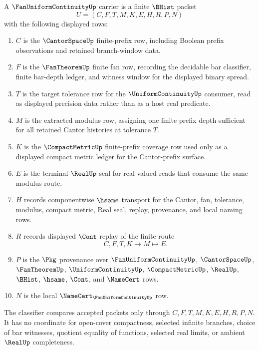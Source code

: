 \begin{definition}
\label{def:fan-uniform-continuity-carrier}
A $\FanUniformContinuityUp$ carrier is a finite $\BHist$ packet
$$
U=(C,F,T,M,K,E,H,R,P,N)
$$
with the following displayed rows:
\begin{enumerate}
\item $C$ is the $\CantorSpaceUp$ finite-prefix row, including Boolean prefix observations and retained branch-window data.
\item $F$ is the $\FanTheoremUp$ finite fan row, recording the decidable bar classifier, finite bar-depth ledger, and witness window for the displayed binary spread.
\item $T$ is the target tolerance row for the $\UniformContinuityUp$ consumer, read as displayed precision data rather than as a host real predicate.
\item $M$ is the extracted modulus row, assigning one finite prefix depth sufficient for all retained Cantor histories at tolerance $T$.
\item $K$ is the $\CompactMetricUp$ finite-prefix coverage row used only as a displayed compact metric ledger for the Cantor-prefix surface.
\item $E$ is the terminal $\RealUp$ seal for real-valued reads that consume the same modulus route.
\item $H$ records componentwise $\hsame$ transport for the Cantor, fan, tolerance, modulus, compact metric, Real seal, replay, provenance, and local naming rows.
\item $R$ records displayed $\Cont$ replay of the finite route
$$
C,F,T,K \longmapsto M \longmapsto E .
$$
\item $P$ is the $\Pkg$ provenance over $\FanUniformContinuityUp$, $\CantorSpaceUp$, $\FanTheoremUp$, $\UniformContinuityUp$, $\CompactMetricUp$, $\RealUp$, $\BHist$, $\hsame$, $\Cont$, and $\NameCert$ rows.
\item $N$ is the local $\NameCert_{\FanUniformContinuityUp}$ row.
\end{enumerate}
The classifier compares accepted packets only through $C,F,T,M,K,E,H,R,P,N$. It has no coordinate for open-cover compactness, selected infinite branches, choice of bar witnesses, quotient equality of functions, selected real limits, or ambient $\RealUp$ completeness.
\end{definition}

